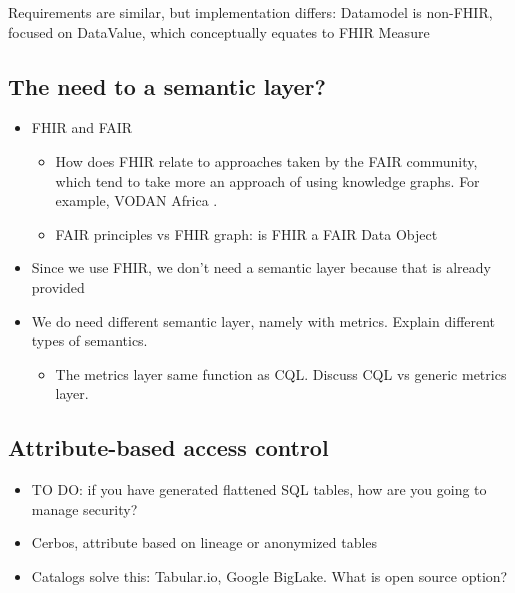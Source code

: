 \documentclass[
  authoryear]{elsarticle}
\providecommand{\tightlist}{%
  \setlength{\itemsep}{0pt}\setlength{\parskip}{0pt}}\usepackage{longtable,booktabs,array}
\begin{document}
Requirements are similar, but implementation differs: Datamodel is
non-FHIR, focused on DataValue, which conceptually equates to FHIR
Measure

\subsection{The need to a semantic
layer?}\label{the-need-to-a-semantic-layer}

\begin{itemize}
\tightlist
\item
  FHIR and FAIR

  \begin{itemize}
  \tightlist
  \item
    How does FHIR relate to approaches taken by the FAIR community,
    which tend to take more an approach of using knowledge graphs. For
    example, VODAN Africa
    \citep{gebreslassie2023fhir4fair, purnamajati2022data}.
  \item
    FAIR principles vs FHIR graph: is FHIR a FAIR Data Object
  \end{itemize}
\item
  Since we use FHIR, we don't need a semantic layer because that is
  already provided
\item
  We do need different semantic layer, namely with metrics. Explain
  different types of semantics.

  \begin{itemize}
  \tightlist
  \item
    The metrics layer same function as CQL. Discuss CQL vs generic
    metrics layer.
  \end{itemize}
\end{itemize}

\subsection{Attribute-based access
control}\label{attribute-based-access-control}

\begin{itemize}
\tightlist
\item
  TO DO: if you have generated flattened SQL tables, how are you going
  to manage security?
\item
  Cerbos, attribute based on lineage or anonymized tables
\item
  Catalogs solve this: Tabular.io, Google BigLake. What is open source
  option?
\end{itemize}
\end{document}
